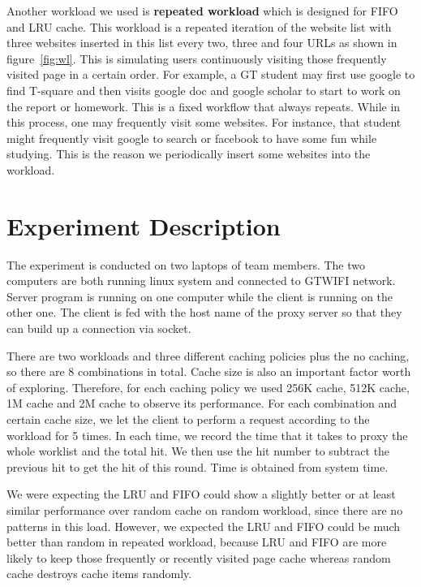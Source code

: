 \documentclass[paper=a4, fontsize=11pt]{scrartcl} %
\numberwithin{equation}{section} %
\numberwithin{figure}{section} %
\numberwithin{table}{section} %
\begin{document}
Another workload we used is \textbf{repeated workload} which is designed for FIFO and LRU cache. This workload is a repeated iteration of the website list with three websites inserted in this list every two, three and four URLs as shown in figure~\ref{fig:wl}. This is simulating users continuously visiting those frequently visited page in a certain order. For example, a GT student may first use google to find T-square and then visits google doc and google scholar to start to work on the report or homework. This is a fixed workflow that always repeats. While in this process, one may frequently visit some websites. For instance, that student might frequently visit google to search or facebook to have some fun while studying. This is the reason we periodically insert some websites into the workload.  
    


\section{Experiment Description}

The experiment is conducted on two laptops of team members. The two computers are both running linux system and connected to GTWIFI network. Server program is running on one computer while the client is running on the other one. The client is fed with the host name of the proxy server so that they can build up a connection via socket. 

\vspace{0.5em}

There are two workloads and three different caching policies plus the no caching, so there are 8 combinations in total. Cache size is also an important factor worth of exploring. Therefore, for each caching policy we used 256K cache, 512K cache, 1M cache and 2M cache to observe its 
performance. For each combination and certain cache size, we let the client to perform a request according to the workload for 5 times. In each time, we record the time that it takes to proxy the whole worklist and the total hit. We then use the hit number to subtract the previous hit to get the hit of this round. Time is obtained from system time. 

\vspace{0.5em}

We were expecting the LRU and FIFO could show a slightly better or at least similar performance over random cache on random workload, since there are no patterns in this load. However, we expected the LRU and FIFO could be much better than random in repeated workload, because LRU and FIFO are more likely to keep those frequently or recently visited page cache whereas random cache destroys cache items randomly. 
\end{document}
